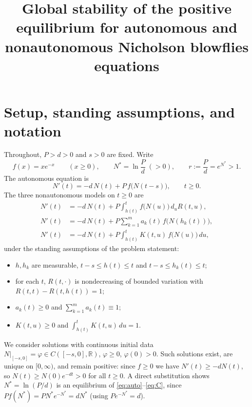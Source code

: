 \documentclass[12pt]{article}
\title{Global stability of the positive equilibrium for autonomous and
nonautonomous Nicholson blowflies equations}
\author{}
\date{}
\theoremstyle{definition}
\newcommand{\R}{\mathbb{R}}
\begin{document}
\maketitle

\section{Setup, standing assumptions, and notation}

Throughout, $P>d>0$ and $s>0$ are fixed. Write
\[
  f(x)=x e^{-x}\qquad(x\ge 0),\qquad
  N^{*}=\ln\frac{P}{d}\;(>0),\qquad r:=\frac{P}{d}=e^{N^{*}}>1 .
\]
The autonomous equation is
\begin{equation}\label{eq:auto}
  N'(t)=-d\,N(t)+P\,f\bigl(N(t-s)\bigr),\qquad t\ge 0 .
\end{equation}
The three nonautonomous models on $t\ge0$ are
\begin{align}
  N'(t)&=-d\,N(t)+P\!\int_{h(t)}^{t}\! f\bigl(N(u)\bigr)\,d_uR(t,u),\label{eq:A}\tag{A}\\
  N'(t)&=-d\,N(t)+P\sum_{k=1}^{m}a_k(t)\,f\bigl(N(h_k(t))\bigr),\label{eq:B}\tag{B}\\
  N'(t)&=-d\,N(t)+P\!\int_{h(t)}^{t}\! K(t,u)\,f\bigl(N(u)\bigr)\,du,\label{eq:C}\tag{C}
\end{align}
under the standing assumptions of the problem statement:
\begin{itemize}
\item $h,h_k$ are measurable, $t-s\le h(t)\le t$ and $t-s\le h_k(t)\le t$;
\item for each $t$, $R(t,\cdot)$ is nondecreasing of bounded variation with
$R(t,t)-R(t,h(t))=1$;
\item $a_k(t)\ge 0$ and $\sum_{k=1}^m a_k(t)\equiv 1$;
\item $K(t,u)\ge 0$ and $\int_{h(t)}^t K(t,u)\,du=1$.
\end{itemize}
We consider solutions with continuous initial data
$N|_{[-s,0]}=\varphi\in C([-s,0],\R)$, $\varphi\ge 0$, $\varphi(0)>0$.
Such solutions exist, are unique on $[0,\infty)$, and remain positive: since
$f\ge0$ we have $N'(t)\ge -dN(t)$, so $N(t)\ge N(0)e^{-dt}>0$ for all $t\ge0$.
A direct substitution shows $N^{*}=\ln(P/d)$ is an equilibrium of
\eqref{eq:auto}--\eqref{eq:C}, since $Pf(N^*)=PN^*e^{-N^*}=dN^*$ (using
$Pe^{-N^*}=d$).
\end{document}
